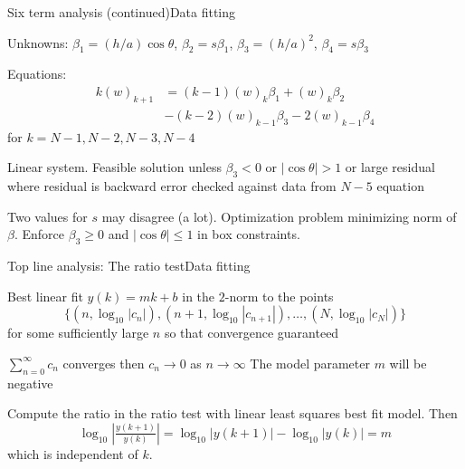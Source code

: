 \documentclass[11pt,svgnames,fleqn]{beamer}
\newcommand{\parbg}[1]{\left(  {#1} \right)}
\newcommand{\Setbg}[1]{\bigl\{ {#1} \bigr\}}
\newcommand{\NC}[1]{{\color{red}#1}}
\newcommand{\DM}[1]{\begin{displaymath} {#1} \end{displaymath}}
\newcommand{\tc}[2]{(#1)_{#2}}
\begin{document}
\begin{frame}{Six term analysis (continued)}{Data fitting}

 Unknowns:
  $\beta_1 = (h/a) \cos \theta$,
  $\beta_2 = s \beta_1$,
  $\beta_3 = (h/a)^2$,
  $\beta_4 = s \beta_3$

  \vspace{2mm}

  Equations:
  \begin{align*}
    k \tc{w}{k+1} & = \parbg{k-1} \tc{w}{k} \beta_1 +  \tc{w}{k} \beta_2 \\
                  & - \parbg{k-2} \tc{w}{k-1} \beta_3 - 2 \tc{w}{k-1} \beta_4
  \end{align*}
  for $k=N-1, N-2, N-3, N-4$

  \vspace{2mm}

  Linear system. Feasible solution unless $\beta_3 < 0$ or $|\cos \theta| > 1$ or
  large residual where residual is backward error checked against
  data from $N-5$ equation

  \vspace{2mm}

  Two values for $s$ may disagree (a lot).
  Optimization problem minimizing norm of $\beta$.
  Enforce $\beta_3 \geq 0$ and $|\cos \theta| \leq 1$ in box constraints.

\end{frame}

\begin{frame}{Top line analysis: The ratio test}{Data fitting}

Best linear fit $y(k) = m k + b$ in the $2$-norm to the points
\DM
{
  \Setbg{(n, \log_{10} | c_{n} |), (n+1, \log_{10} |c_{n+1}|), \ldots, (N, \log_{10} |c_{N}|)}
}
for some sufficiently large $n$ so that convergence guaranteed
\vspace{4mm}

$\sum_{n=0}^{\infty} c_n$ converges then $c_n \rightarrow 0$ as $n \rightarrow \infty$
\NC{The model parameter $m$ will be negative}

\vspace{4mm}

Compute the ratio in the ratio test with linear least squares best fit model. Then
\DM
{
  \log_{10} \left| \tfrac{y(k+1)}{y(k)} \right| = \log_{10} | y(k+1) | - \log_{10} | y(k) | = m
}
which is independent of $k$.

\end{frame}
\end{document}
